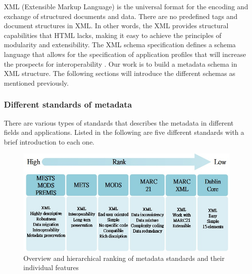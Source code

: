 XML (Extensible Markup Language) is the universal format for the encoding and exchange of structured documents and data. There are no predefined tags and document structures in XML. In other words, the XML provides structural capabilities that HTML lacks, making it easy to achieve the principles of modularity and extensibility. The XML schema specification defines a schema language that allows for the specification of application profiles that will increase the prospects for interoperability \cite{duval2002}. Our work is to build a metadata schema in XML structure. The following sections will introduce the different schemas as mentioned previously.


\subsubsection*{Different standards of metadata}
\label{sec:mets}
There are various types of standards that describes the metadata in different fields and applications. Listed in the following are five different standards with a brief introduction to each one.

\begin{figure}		
	\begin{center}
		\includegraphics[scale=0.8]{EagleUnit_Background_Chart_1}
	\end{center}
	\caption{Overview and hierarchical ranking of metadata standards and their individual features}
\end{figure}

